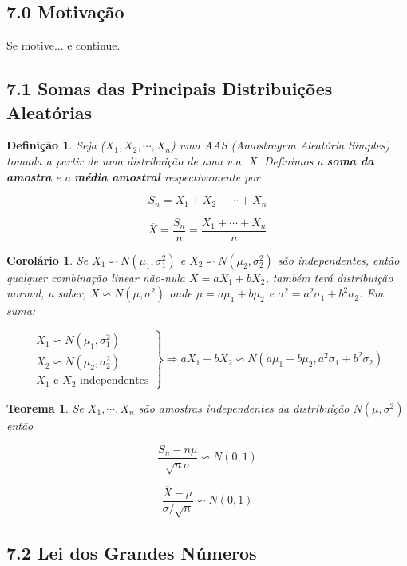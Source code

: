 \documentclass[12pt]{article}
\newtheorem{theorem}{Teorema}[section]
\newtheorem{corollary}{Corolário}[theorem]
\newtheorem{definition}{Definição}
\begin{document}
\subsection*{7.0 Motivação}
Se motive... e continue.

\subsection*{7.1 Somas das Principais Distribuições Aleatórias}
\label{s31}

\begin{definition}
    Seja ($X_1, X_2, \cdots, X_n$) uma AAS (Amostragem Aleatória Simples) tomada a partir de uma distribuição de uma v.a. X. Definimos a \textbf{soma da amostra} e a \textbf{média amostral} respectivamente por
    
    $$S_n = X_1 + X_2 + \cdots + X_n$$
    
    $$\overline{X} = \frac{S_n}{n} = \frac{X_1 + \cdots + X_n}{n}$$
\end{definition}

\begin{corollary}
    Se $X_1 \backsim N(\mu_1, \sigma_1^2)$ e $X_2 \backsim N(\mu_2, \sigma_2^2)$ são independentes, então qualquer combinação linear não-nula $X = a X_1 + b X_2$, também terá distribuição normal, a saber, $X \backsim N(\mu, \sigma^2)$ onde $\mu = a \mu_1 + b \mu_2$ e $\sigma^2 = a^2 \sigma_1 + b^2 \sigma_2$. Em suma:
    
    $$
    \left . \begin{array}{lll}
        X_1 \backsim N (\mu_1, \sigma_1^2) \\
        X_2 \backsim N (\mu_2, \sigma_2^2) \\
        X_1 \text{ e } X_2 \text{ independentes}
    \end{array} \right \} \Rightarrow a X_1 + b X_2 \backsim N(a \mu_1 + b \mu_2, a^2 \sigma_1 + b^2 \sigma_2)
    $$
\end{corollary}

\begin{theorem}
    Se $X_1, \cdots, X_n$ são amostras independentes da distribuição $N(\mu, \sigma^2)$ então
    
    $$\frac{S_n - n \mu}{\sqrt{n} \sigma} \backsim N(0, 1)$$
    
    $$\frac{\overline{X} - \mu}{\sigma / \sqrt{n}} \backsim N(0, 1)$$
\end{theorem}

\subsection*{7.2 Lei dos Grandes Números}
\label{s32}
\end{document}
